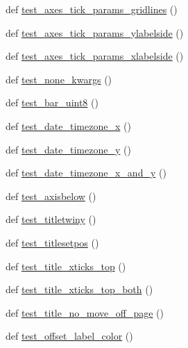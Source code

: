 \begin{DoxyCompactItemize}
\item 
def \hyperlink{namespacematplotlib_1_1tests_1_1test__axes_a8626e8ebf263935105ff27e8daa6eb29}{test\+\_\+axes\+\_\+tick\+\_\+params\+\_\+gridlines} ()
\item 
def \hyperlink{namespacematplotlib_1_1tests_1_1test__axes_aea13f2357ed027a90a57ba18e3052976}{test\+\_\+axes\+\_\+tick\+\_\+params\+\_\+ylabelside} ()
\item 
def \hyperlink{namespacematplotlib_1_1tests_1_1test__axes_a23352ac204d97aa273cf7b156bed8fa5}{test\+\_\+axes\+\_\+tick\+\_\+params\+\_\+xlabelside} ()
\item 
def \hyperlink{namespacematplotlib_1_1tests_1_1test__axes_ade7fcc6e950f1d91316380bbcbb0a394}{test\+\_\+none\+\_\+kwargs} ()
\item 
def \hyperlink{namespacematplotlib_1_1tests_1_1test__axes_a8dfe5dcfcdbffe9133300e30460922ab}{test\+\_\+bar\+\_\+uint8} ()
\item 
def \hyperlink{namespacematplotlib_1_1tests_1_1test__axes_aecae431e87739a0d6b0ac2d1ca2c1552}{test\+\_\+date\+\_\+timezone\+\_\+x} ()
\item 
def \hyperlink{namespacematplotlib_1_1tests_1_1test__axes_adbc02814d8ab5e4899b6eb4fee0c5cd7}{test\+\_\+date\+\_\+timezone\+\_\+y} ()
\item 
def \hyperlink{namespacematplotlib_1_1tests_1_1test__axes_a00a03301c70c2b14048c5007c9fc5936}{test\+\_\+date\+\_\+timezone\+\_\+x\+\_\+and\+\_\+y} ()
\item 
def \hyperlink{namespacematplotlib_1_1tests_1_1test__axes_a3368b658d107a4b51b454cb1b462ffc7}{test\+\_\+axisbelow} ()
\item 
def \hyperlink{namespacematplotlib_1_1tests_1_1test__axes_acd00f395e1c156526fda815ff94a9094}{test\+\_\+titletwiny} ()
\item 
def \hyperlink{namespacematplotlib_1_1tests_1_1test__axes_aa0fb0082301e560d09962943f59b4bc2}{test\+\_\+titlesetpos} ()
\item 
def \hyperlink{namespacematplotlib_1_1tests_1_1test__axes_a8f3d2ddf973eb05843052a43c3ef5ce4}{test\+\_\+title\+\_\+xticks\+\_\+top} ()
\item 
def \hyperlink{namespacematplotlib_1_1tests_1_1test__axes_a3d066d4de73ff43387ecc5c700c7a925}{test\+\_\+title\+\_\+xticks\+\_\+top\+\_\+both} ()
\item 
def \hyperlink{namespacematplotlib_1_1tests_1_1test__axes_af85de400b40ddbaac6e1cd25c3175457}{test\+\_\+title\+\_\+no\+\_\+move\+\_\+off\+\_\+page} ()
\item 
def \hyperlink{namespacematplotlib_1_1tests_1_1test__axes_ab37b11a99c2941c114301b7adb9431a4}{test\+\_\+offset\+\_\+label\+\_\+color} ()

\end{DoxyCompactItemize}
